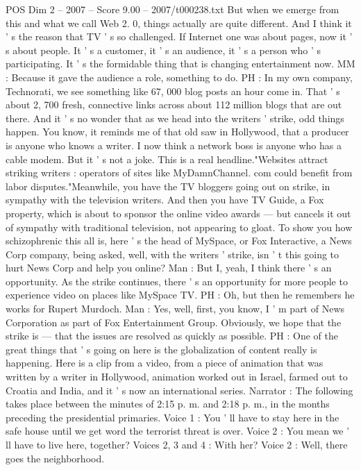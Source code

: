 \begin{textsample}{POS Dim 2 – 2007 – Score 9.00 – 2007/t000238.txt}
But when we emerge from this and what we call Web 2. 0, things actually are quite different.
And I think it ' s the reason that TV ' s so challenged.
If Internet one was about pages, now it ' s about people.
It ' s a customer, it ' s an audience, it ' s a person who ' s participating.
It ' s the formidable thing that is changing entertainment now.
MM : Because it gave the audience a role, something to do.
PH : In my own company, Technorati, we see something like 67, 000 blog posts an hour come in.
That ' s about 2, 700 fresh, connective links across about 112 million blogs that are out there.
And it ' s no wonder that as we head into the writers ' strike, odd things happen.
You know, it reminds me of that old saw in Hollywood, that a producer is anyone who knows a writer.
I now think a network boss is anyone who has a cable modem.
But it ' s not a joke.
This is a real headline."Websites attract striking writers : operators of sites like MyDamnChannel. com could benefit from labor disputes."Meanwhile, you have the TV bloggers going out on strike, in sympathy with the television writers.
And then you have TV Guide, a Fox property, which is about to sponsor the online video awards — but cancels it out of sympathy with traditional television, not appearing to gloat.
To show you how schizophrenic this all is, here ' s the head of MySpace, or Fox Interactive, a News Corp company, being asked, well, with the writers ' strike, isn ' t this going to hurt News Corp and help you online?
Man : But I, yeah, I think there ' s an opportunity.
As the strike continues, there ' s an opportunity for more people to experience video on places like MySpace TV.
PH : Oh, but then he remembers he works for Rupert Murdoch.
Man : Yes, well, first, you know, I ' m part of News Corporation as part of Fox Entertainment Group.
Obviously, we hope that the strike is — that the issues are resolved as quickly as possible.
PH : One of the great things that ' s going on here is the globalization of content really is happening.
Here is a clip from a video, from a piece of animation that was written by a writer in Hollywood, animation worked out in Israel, farmed out to Croatia and India, and it ' s now an international series.
Narrator : The following takes place between the minutes of 2:15 p. m. and 2:18 p. m., in the months preceding the presidential primaries.
Voice 1 : You ' ll have to stay here in the safe house until we get word the terrorist threat is over.
Voice 2 : You mean we ' ll have to live here, together?
Voices 2, 3 and 4 : With her?
Voice 2 : Well, there goes the neighborhood.

\end{textsample}
